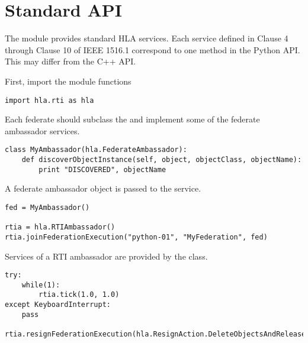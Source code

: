 \section{Standard API}

The  module provides standard HLA services.
Each service defined in Clause 4 through Clause 10 of IEEE 1516.1 correspond to
one method in the Python API. This may differ from the C++ API.

First, import the module functions
\begin{verbatim}
import hla.rti as hla
\end{verbatim}

Each federate should subclass the  and implement some
of the federate ambassador services.
\begin{verbatim}
class MyAmbassador(hla.FederateAmbassador):
    def discoverObjectInstance(self, object, objectClass, objectName):
        print "DISCOVERED", objectName
\end{verbatim}

A federate ambassador object is passed to the 
service.

\begin{verbatim}
fed = MyAmbassador()

rtia = hla.RTIAmbassador()
rtia.joinFederationExecution("python-01", "MyFederation", fed)
\end{verbatim}

Services of a RTI ambassador are provided by the  class.

\begin{verbatim}
try:
    while(1):
        rtia.tick(1.0, 1.0)
except KeyboardInterrupt:
    pass

rtia.resignFederationExecution(hla.ResignAction.DeleteObjectsAndReleaseAttributes)
\end{verbatim}



